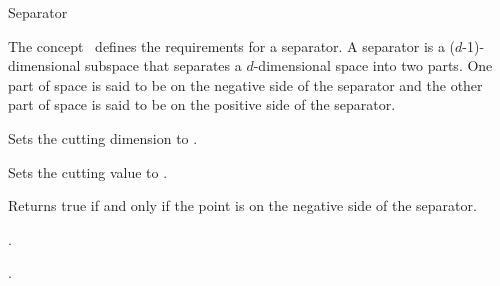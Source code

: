 \begin{ccRefConcept}{Separator}



\ccDefinition
  
The concept \ccRefName\ defines the requirements for a separator.
A separator is a ($d$-1)-dimensional subspace that separates a $d$-dimensional space into two parts.
One part of space is said to be on the negative side of the separator and the other part of space is 
said to be on the positive side of the separator.

\ccTypes


\ccCreation
{}  %


\ccOperations

{Sets the cutting dimension to . }

{Sets the cutting value to . }





{Returns true if and only if the point  is on the negative side of the separator.}


\ccHasModels

.

\ccSeeAlso

.


\end{ccRefConcept}


